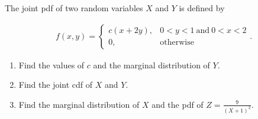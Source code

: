 
\begin{exercise}

The joint pdf of two random variables $X$ and $Y$ is defined by

\begin{align*}
    f(x, y)
    =
    \begin{cases}
        c (x + 2 y), & 0 < y < 1 ~\text{and}~ 0 < x < 2 \\
        0,           & \text{otherwise}
    \end{cases}.
\end{align*}

\begin{enumerate}[label = (\alph*)]
    \item Find the values of $c$ and the marginal distribution of $Y$.
    \item Find the joint cdf of $X$ and $Y$.
    \item Find the marginal distribution of $X$ and the pdf of $Z = \frac{9}{(X + 1)^2}$.
\end{enumerate}

\end{exercise}


